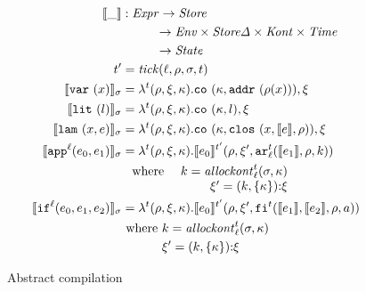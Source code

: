 \documentclass[preprint,onecolumn,9pt]{sigplanconf} %
\begin{document}
\begin{figure}
\small
\begin{align*}
\compile{\_} &: \Expr \to \Store \\
             &\phantom{: \Expr } \to \Env  \times \StoreDelta \times \Kont \times \Counter \\
             &\phantom{: \Expr } \to \State \\
\mcntr' &= \tick(\mlab,\menv,\msto,\mcntr) \\
\compile{\svar\mvar}_\msto &=
 \lambda^\mcntr(\menv,\msdiff,\mkont) .
\spchoice
{\co{\mkont,\saddr{\menv(\mvar)}},\msdiff}
{\co{\mkont,\superposition{\msto(\menv(\mvar))}},\msdiff}
\\
\compile{\slit\mlit}_\msto &= \lambda^\mcntr(\menv,\msdiff,\mkont) .
\co{\mkont,\mlit},\msdiff
\\
\compile{\slam\mvar\mexp}_\msto &= \lambda^\mcntr(\menv,\msdiff,\mkont) .
\co{\mkont,\clos{\mvar,\compile{\mexp},\menv}},\msdiff
\\
\compile{\sapp[^\mlab]{\mexpi0}{\mexpi1}}_\msto &= \lambda^\mcntr(\menv,\msdiff,\mkont) .
\compile{\mexpi0}^{\mcntr'}(\menv,\msdiff',\kar[_\mlab^\mcntr]{\compile{\mexpi1},\menv,\mkaddr})
\\
&\setlength\arraycolsep{5pt}
\begin{array}{lrl}
\text{ where } & \mkaddr = \allockont^\mcntr_\mlab(\msto,\mkont) \\
               & \msdiff' = \cons{\ttuple{\mkaddr}{\setof{\mkont}}}{\msdiff}
\end{array}
\\
\compile{\sif[^\mlab]{\mexpi0}{\mexpi1}{\mexpi2}}_\msto &= \lambda^\mcntr(\menv,\msdiff,\mkont) .
\compile{\mexpi0}^{\mcntr'}(\menv,\msdiff',\kif[^\mcntr]{\compile{\mexpi1},\compile{\mexpi2},\menv,\maddr})
\\
&\text{ where }\mkaddr = \allockont^\mcntr_\mlab(\msto,\mkont) \\
&\phantom{\text{ where }} \msdiff' = \cons{\ttuple{\mkaddr}{\setof{\mkont}}}{\msdiff}
\end{align*}
\caption{Abstract compilation}
\label{fig:compile}
\end{figure}
\end{document}
